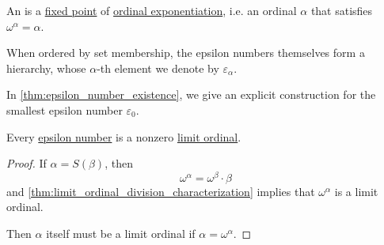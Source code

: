 \begin{definition}\label{def:epsilon_number}
  An  is a \hyperref[def:dynamical_system_fixed_point]{fixed point} of \hyperref[def:ordinal_exponentiation]{ordinal exponentiation}, i.e. an ordinal \( \alpha \) that satisfies \( \omega^\alpha = \alpha \).

  When ordered by set membership, the epsilon numbers themselves form a hierarchy, whose \( \alpha \)-th element we denote by \( \varepsilon_\alpha \).
\end{definition}
\begin{comments}
  \item In \cref{thm:epsilon_number_existence}, we give an explicit construction for the smallest epsilon number \( \varepsilon_0 \).
\end{comments}

\begin{lemma}\label{thm:epsilon_number_limit_ordinal}
  Every \hyperref[def:epsilon_number]{epsilon number} is a nonzero \hyperref[def:successor_and_limit_ordinal]{limit ordinal}.
\end{lemma}
\begin{proof}
  If \( \alpha = S(\beta) \), then
  \begin{equation*}
    \omega^\alpha
    =
    \omega^\beta \cdot \beta
  \end{equation*}
  and \cref{thm:limit_ordinal_division_characterization} implies that \( \omega^\alpha \) is a limit ordinal.

  Then \( \alpha \) itself must be a limit ordinal if \( \alpha = \omega^\alpha \).
\end{proof}

